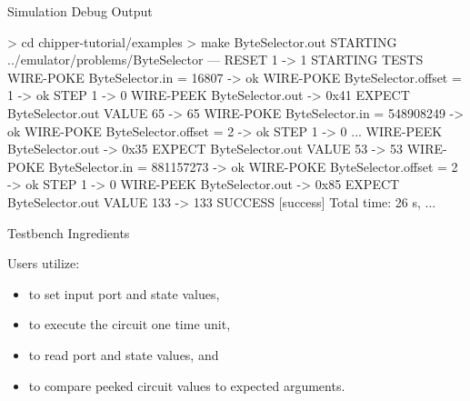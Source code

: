 \documentclass[xcolor=pdflatex,dvipsnames,table]{beamer}
\begin{document}
\begin{frame}[fragile]{Simulation Debug Output}

{
\begin{stanza}
> cd chipper-tutorial/examples
> make ByteSelector.out
STARTING ../emulator/problems/ByteSelector
---
RESET 1 -> 1
STARTING TESTS
WIRE-POKE ByteSelector.in = 16807 -> ok
WIRE-POKE ByteSelector.offset = 1 -> ok
STEP 1 -> 0
WIRE-PEEK ByteSelector.out -> 0x41
EXPECT ByteSelector.out VALUE 65 -> 65
WIRE-POKE ByteSelector.in = 548908249 -> ok
WIRE-POKE ByteSelector.offset = 2 -> ok
STEP 1 -> 0
...
WIRE-PEEK ByteSelector.out -> 0x35
EXPECT ByteSelector.out VALUE 53 -> 53
WIRE-POKE ByteSelector.in = 881157273 -> ok
WIRE-POKE ByteSelector.offset = 2 -> ok
STEP 1 -> 0
WIRE-PEEK ByteSelector.out -> 0x85
EXPECT ByteSelector.out VALUE 133 -> 133
SUCCESS
[success] Total time: 26 s, ...
\end{stanza}
}

\end{frame}

\begin{frame}{Testbench Ingredients}

Users utilize:
\begin{itemize}
\item {} to set input port and state values,
\item {} to execute the circuit one time unit,
\item {} to read port and state values, and
\item {} to compare peeked circuit values to expected arguments.
\end{itemize}

\end{frame}
\end{document}
